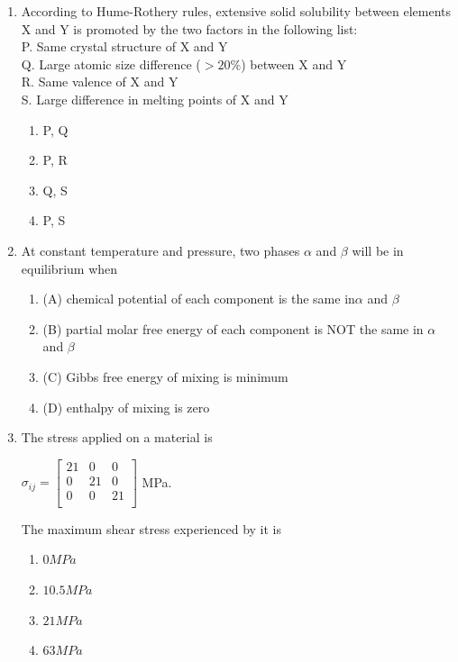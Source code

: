 \documentclass[journal]{IEEEtran}
\theoremstyle{remark}
\begin{document}
\begin{enumerate}
\item According to Hume-Rothery rules, extensive solid solubility between elements X and Y is promoted by 
the two factors in the following list:\hfill{}\\
P. Same crystal structure of X and Y\\
Q. Large atomic size difference ($>20\%$) between X and Y\\
R. Same valence of X and Y\\
S. Large difference in melting points of X and Y\\
\begin{multicols}{4}
\begin{enumerate}
\item  P, Q
\item  P, R
\item Q, S
\item P, S
\end{enumerate}
\end{multicols}

\item At constant temperature and pressure, two phases $\alpha$ and $\beta$ will be in equilibrium when\hfill{}\\
\begin{enumerate}
\item(A) chemical potential of each component is the same in$\alpha$  and $\beta$\\
\item (B) partial molar free energy of each component is NOT the same in $\alpha$  and $\beta$\\
\item (C) Gibbs free energy of mixing is minimum
\item (D) enthalpy of mixing is zero
\end{enumerate}

	\item  The stress applied on a material is
    \hfill{}\\
    \begin{center}
$\sigma_{ij} = 
\begin{bmatrix}
    21&0&0\\
    0&21&0\\
    0&0&21\\
\end{bmatrix}$ MPa.\\
 \end{center}
The maximum shear stress experienced by it is
\begin{multicols}{4}
\begin{enumerate}
\item  $0 MPa$
\item  $10.5 MPa$
\item  $21 MPa$
\item  $63 MPa$
\end{enumerate}
\end{multicols}


\end{enumerate}
\end{document}
